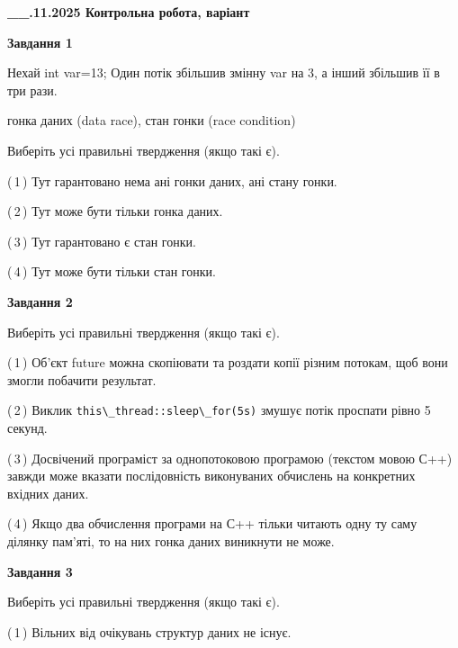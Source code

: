 \documentclass[12pt, ukrainian]{article}
\def\code#1{\Verb!#1!}
\begin{document}
\begin {large}

\textbf{\_\_.11.2025 Контрольна робота, варіант  }\par


{

\begin{center}
\textbf{Завдання 1}
\end{center}
Нехай int var=13; Один потік збільшив змінну var на 3, а інший збільшив її в три рази.

гонка даних (data race), стан гонки (race condition)

Виберіть усі правильні твердження (якщо такі є).\par
\vspace{2mm}
(\,1\,) Тут гарантовано нема ані гонки даних, ані стану гонки.%

(\,2\,) Тут може бути тільки гонка даних.%

(\,3\,) Тут гарантовано є стан гонки.%

(\,4\,) Тут може бути тільки стан гонки.%



\begin{center}
\textbf{Завдання 2}
\end{center}
Виберіть усі правильні твердження (якщо такі є).\par
\vspace{2mm}

(\,1\,) Об’єкт future можна скопіювати та роздати копії різним потокам, щоб вони змогли побачити результат.%

(\,2\,) Виклик \code{this\_thread::sleep\_for(5s)} змушує потік проспати рівно 5 секунд.%

(\,3\,) Досвічений програміст за однопотоковою програмою (текстом мовою С++) завжди може вказати послідовність виконуваних обчислень на конкретних вхідних даних.%

(\,4\,) Якщо два обчислення програми на С++ тільки читають одну ту саму ділянку пам'яті, то на них гонка даних  виникнути не може.%



\begin{center}
\textbf{Завдання 3}
\end{center}
Виберіть усі правильні твердження (якщо такі є).\par
\vspace{2mm}

(\,1\,) Вільних від очікувань структур даних не існує.%

}
\end{large}
\end{document}

